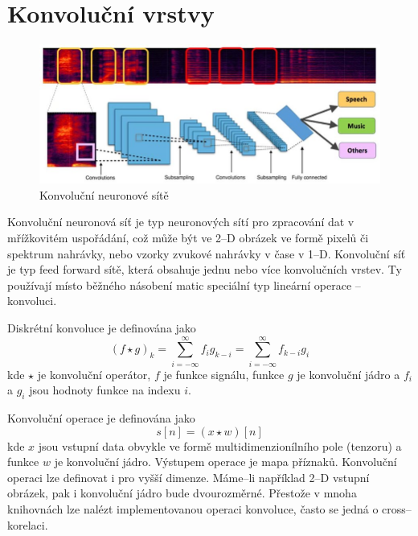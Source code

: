 \section{Konvoluční vrstvy}
\begin{figure}[H]
    \centering
    \includegraphics[scale=0.5]{obrazky-figures/conv_nn_audio.jpg}
    \caption{\label{fig:conv_nn}Konvoluční neuronové sítě}
\end{figure}
Konvoluční neuronová síť  je typ neuronových sítí pro zpracování dat v mřížkovitém uspořádání, což může být ve 2--D obrázek ve formě pixelů či spektrum nahrávky, nebo vzorky zvukové nahrávky v čase v 1--D. Konvoluční síť je typ feed forward sítě, která obsahuje jednu nebo více konvolučních vrstev. Ty používají místo běžného násobení matic speciální typ lineární operace -- konvoluci. 


Diskrétní konvoluce je definována jako
\begin{equation}
   (f \star g)_k = \sum_{i=-\infty}^{\infty} f_i g_{k-i} = \sum_{i=-\infty}^{\infty} f_{k-i} g_{i}
\end{equation}
kde $\star$ je konvoluční operátor, $f$ je funkce signálu, funkce $g$ je konvoluční jádro a $f_i$ a $g_i$ jsou hodnoty funkce na indexu $i$.


Konvoluční operace je definována jako
\begin{equation}
   s[n] = (x \star w)[n]
\end{equation}
kde $x$ jsou vstupní data obvykle ve formě multidimenzionílního pole (tenzoru) a funkce $w$ je konvoluční jádro. Výstupem operace je mapa příznaků. Konvoluční operaci lze definovat i pro vyšší dimenze. Máme--li například 2--D vstupní obrázek, pak i konvoluční jádro bude dvourozměrné. Přestože v mnoha knihovnách lze nalézt implementovanou operaci konvoluce, často se jedná o cross--korelaci.


